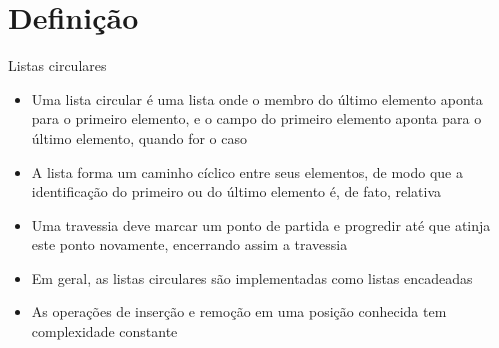 \section{Definição}

\begin{frame}[fragile]{Listas circulares}

    \begin{itemize}
        \item Uma lista circular é uma lista onde o membro   do último elemento
            aponta para o primeiro elemento, e o campo  do primeiro elemento
            aponta para o último elemento, quando for o caso

        \item A lista forma um caminho cíclico entre seus elementos, de modo que a identificação
            do primeiro ou do último elemento é, de fato, relativa

        \item Uma travessia deve marcar um ponto de partida e progredir até que atinja este
            ponto novamente, encerrando assim a travessia

        \item Em geral, as listas circulares são implementadas como listas encadeadas

        \item As operações de inserção e remoção em uma posição conhecida tem complexidade
            constante
    \end{itemize}

\end{frame}

